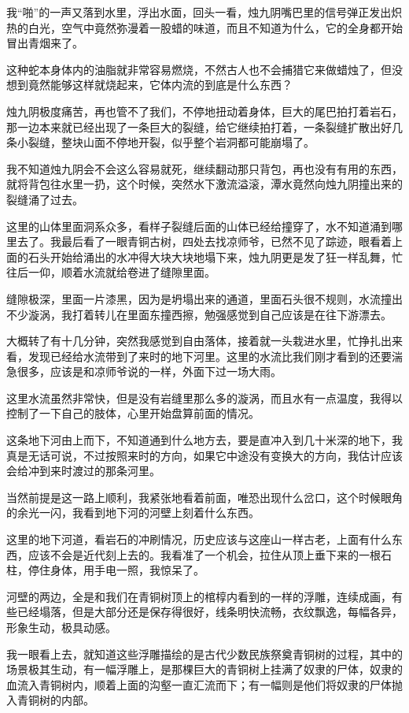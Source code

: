 我“啪”的一声又落到水里，浮出水面，回头一看，烛九阴嘴巴里的信号弹正发出炽热的白光，空气中竟然弥漫着一股蜡的味道，而且不知道为什么，它的全身都开始冒出青烟来了。

这种蛇本身体内的油脂就非常容易燃烧，不然古人也不会捕猎它来做蜡烛了，但没想到竟然能够这样就烧起来，它体内流的到底是什么东西？

烛九阴极度痛苦，再也管不了我们，不停地扭动着身体，巨大的尾巴拍打着岩石，那一边本来就已经出现了一条巨大的裂缝，给它继续拍打着，一条裂缝扩散出好几条小裂缝，整块山面不停地开裂，似乎整个岩洞都可能崩塌了。

我不知道烛九阴会不会这么容易就死，继续翻动那只背包，再也没有有用的东西，就将背包往水里一扔，这个时候，突然水下激流溢滚，潭水竟然向烛九阴撞出来的裂缝涌了过去。

这里的山体里面洞系众多，看样子裂缝后面的山体已经给撞穿了，水不知道涌到哪里去了。我最后看了一眼青铜古树，四处去找凉师爷，已然不见了踪迹，眼看着上面的石头开始给涌出的水冲得大块大块地塌下来，烛九阴更是发了狂一样乱舞，忙往后一仰，顺着水流就给卷进了缝隙里面。

缝隙极深，里面一片漆黑，因为是坍塌出来的通道，里面石头很不规则，水流撞出不少漩涡，我打着转儿在里面东撞西擦，勉强感觉到自己应该是在往下游漂去。

大概转了有十几分钟，突然我感觉到自由落体，接着就一头栽进水里，忙挣扎出来看，发现已经给水流带到了来时的地下河里。这里的水流比我们刚才看到的还要湍急很多，应该是和凉师爷说的一样，外面下过一场大雨。

这里水流虽然非常快，但是没有岩缝里那么多的漩涡，而且水有一点温度，我得以控制了一下自己的肢体，心里开始盘算前面的情况。

这条地下河由上而下，不知道通到什么地方去，要是直冲入到几十米深的地下，我真是无话可说，不过按照来时的方向，如果它中途没有变换大的方向，我估计应该会给冲到来时渡过的那条河里。

当然前提是这一路上顺利，我紧张地看着前面，唯恐出现什么岔口，这个时候眼角的余光一闪，我看到地下河的河壁上刻着什么东西。

这里的地下河道，看岩石的冲刷情况，历史应该与这座山一样古老，上面有什么东西，应该不会是近代刻上去的。我看准了一个机会，拉住从顶上垂下来的一根石柱，停住身体，用手电一照，我惊呆了。

河壁的两边，全是和我们在青铜树顶上的棺椁内看到的一样的浮雕，连续成画，有些已经塌落，但是大部分还是保存得很好，线条明快流畅，衣纹飘逸，每幅各异，形象生动，极具动感。

我一眼看上去，就知道这些浮雕描绘的是古代少数民族祭奠青铜树的过程，其中的场景极其生动，有一幅浮雕上，是那棵巨大的青铜树上挂满了奴隶的尸体，奴隶的血流入青铜树内，顺着上面的沟壑一直汇流而下；有一幅则是他们将奴隶的尸体抛入青铜树的内部。

